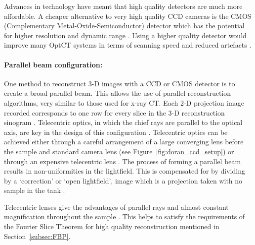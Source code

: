 \documentclass[12pt]{article}
\begin{document}

Advances in technology have meant that  high quality detectors are much more affordable. A cheaper alternative to very high quality CCD cameras is the CMOS (Complementary Metal-Oxide-Semiconductor) detector which has the potential for higher resolution and dynamic range \cite{Doran:2008kh}. Using a higher quality detector would improve many OptCT systems  in terms of scanning speed and reduced artefacts \cite{Tarte:2007, Doran:2001ee}.


\paragraph{Parallel beam configuration:} One method to reconstruct 3-D images with a CCD or CMOS detector is to create a broad parallel beam. This allows the use of parallel reconstruction algorithms, very similar to those used for x-ray CT. Each 2-D projection image recorded corresponds to one row for every slice in the 3-D reconstruction sinogram \cite{Doran:2008kh}.
Telecentric optics, in which the chief rays are parallel to the optical axis, are key in the design of this configuration \cite{Walls:2005ja}. Telecentric optics can be achieved either through a careful arrangement  of  a large converging lens before the sample and standard camera lens  \cite{Doran:2001ee} (see Figure~\ref{fig:doran_ccd_setup}) or through an expensive telecentric lens \cite{Sakhalkar:2008exa}. The process of forming a parallel beam results in non-uniformities in the lightfield. This is compensated for by dividing by a `correction' or `open lightfield', image which is a projection taken with no sample in the tank \cite{Doran:2001ee}.

Telecentric lenses give the advantages of parallel rays and almost constant magnification throughout the sample \cite{Oldham:2007ku}. This helps to satisfy the requirements of the Fourier Slice Theorem for high quality reconstruction mentioned in Section~\ref{subsec:FBP}.
\end{document}

